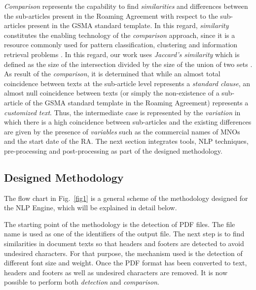 \documentclass[conference]{style/IEEEtran}
\begin{document}
\textit{Comparison} represents the capability to find \textit{similarities} and differences between the sub-articles present in the Roaming Agreement with respect to the sub-articles present in the GSMA standard template. In this regard, \textit{similarity} constitutes the enabling technology of the \textit{comparison} approach, since it is a resource commonly used for pattern classification, clustering and information retrieval problems \cite{7429408}. In this regard, our work uses  \textit{Jaccard's similarity} which is defined as the size of the intersection divided by the size of the union of two sets \cite{Gupta2018}. As result of the \textit{comparison}, it is determined that while an almost total coincidence between texts at the sub-article level represents a \textit{standard clause}, an almost null coincidence between texts (or simply the non-existence of a sub-article of the GSMA standard template in the Roaming Agreement) represents a \textit{customized text}. Thus, the intermediate case is represented by the \textit{variation} in which there is a high coincidence between sub-articles and the existing differences are given by the presence of \textit{variables} such as the commercial names of MNOs and the start date of the RA. The next section integrates tools, NLP techniques, pre-processing and post-processing as part of the designed methodology.

\subsection{Designed Methodology}
The flow chart in Fig.~\ref{fig1} is a general scheme of the methodology designed for the NLP Engine, which will be explained in detail below.

The starting point of the methodology is the detection of PDF files. The file name is used as one of the identifiers of the output file. The next step is to find similarities in document texts so that headers and footers are detected to avoid undesired characters. For that purpose, the mechanism used is the detection of different font size and weight. Once the PDF format has been converted to text, headers and footers as well as undesired characters are removed. It is now possible to perform both \textit{detection} and \textit{comparison}.
\end{document}
